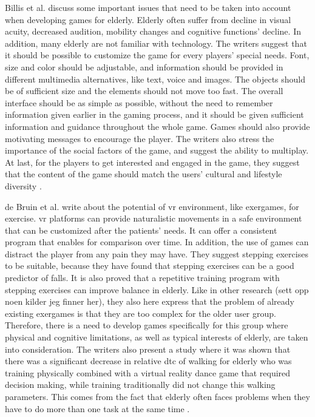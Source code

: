 Billis et al. \cite{Billis} discuss some important issues that need to be taken into account when developing games for elderly. Elderly often suffer from decline in visual acuity, decreased audition, mobility changes and cognitive functions' decline. In addition, many elderly are not familiar with technology. The writers suggest that it should be possible to customize the game for every players' special needs. Font, size and color should be adjustable, and information should be provided in different multimedia alternatives, like text, voice and images. The objects should be of sufficient size and the elements should not move too fast. The overall interface should be as simple as possible, without the need to remember information given earlier in the gaming process, and it should be given sufficient information and guidance throughout the whole game. Games should also provide motivating messages to encourage the player. The writers also stress the importance of the social factors of the game, and suggest the ability to multiplay. At last, for the players to get interested and engaged in the game, they suggest that the content of the game should match the users' cultural and lifestyle diversity \cite{Billis}.

de Bruin et al. \cite{bruin} write about the potential of \ac{vr} environment, like exergames, for exercise. \ac{vr} platforms can provide naturalistic movements in a safe environment that can be customized after the patients' needs. It can offer a consistent program that enables for comparison over time. In addition, the use of games can distract the player from any pain they may have. They suggest stepping exercises to be suitable, because they have found that stepping exercises can be a good predictor of falls. It is also proved that a repetitive training program with stepping exercises can improve balance in elderly. Like in other research (sett opp noen kilder jeg finner her), they also here express that the problem of already existing exergames is that they are too complex for the older user group. Therefore, there is a need to develop games specifically for this group where physical and cognitive limitations, as well as typical interests of elderly, are taken into consideration. The writers also present a study where it was shown that there was a significant decrease in relative \ac{dtc} of walking for elderly who was training physically combined with a virtual reality dance game that required decision making, while training traditionally did not change this walking parameters. This comes from the fact that elderly often faces problems when they have to do more than one task at the same time \cite{bruin}.

